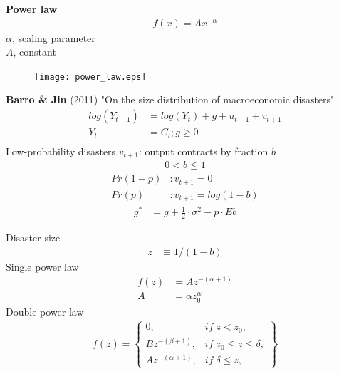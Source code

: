 \documentclass{beamer}
\begin{document}
\begin{frame}
  \textbf{Power law}
  \begin{align}
    f(x)=Ax^{-\alpha}
  \end{align}
  \medskip
  $\alpha$, scaling parameter\\
  $A$, constant
  \begin{figure}
    \texttt{[image: power\_law.eps]}
  \end{figure}
\end{frame}

\begin{frame}
 \textbf{Barro \& Jin} (2011) "On the size distribution of macroeconomic disasters"
 \begin{align}
   log(Y_{t+1}) &= log(Y_t)+g+u_{t+1}+v_{t+1}\\ \nonumber
   Y_t&=C_t; g \geq 0 \\
 \end{align}
 Low-probability disasters $v_{t+1}$: output contracts by fraction $b$
 \begin{align*}
   0 < b \leq 1
 \end{align*}
 \begin{align}
   Pr(1-p) &: v_{t+1}=0\\ \nonumber
   Pr(p) &: v_{t+1} =log(1-b)
 \end{align}
 \begin{align}
   g^* &= g+ \frac{1}{2}\cdot\sigma^2 -p\cdot Eb
 \end{align}
\end{frame}

\begin{frame}
  Disaster size
  \begin{align}
    z &\equiv 1/(1-b)
  \end{align}
  \medskip
  Single power law
  \begin{align}
    f(z) &= Az^{-(\alpha+1)}\\
    A&=\alpha z_0^{\alpha}    
  \end{align}
  \medskip
  Double power law
  \begin{align}
    f(z) = \begin{Bmatrix}
      0, & if\; z<z_0,\\
      Bz^{-(\beta+1)}, & if\; z_0 \leq z \leq \delta,\\
      Az^{-(\alpha+1)}, &if\; \delta \leq z, 
    \end{Bmatrix}
  \end{align}
\end{frame}
\end{document}
